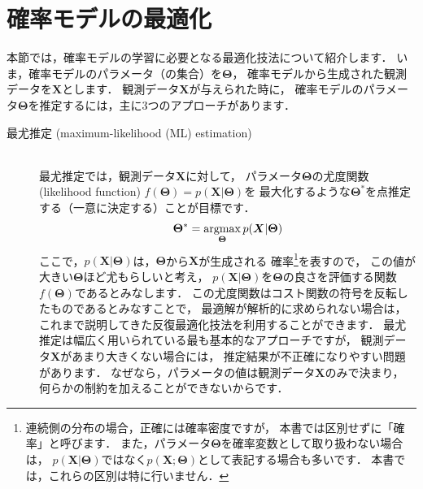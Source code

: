 \section{確率モデルの最適化}
\label{sec:opt_model}

本節では，確率モデルの学習に必要となる最適化技法について紹介します．
いま，確率モデルのパラメータ（の集合）を$\bm\Theta$，
確率モデルから生成された観測データを$\bm{X}$とします．
観測データ$\bm{X}$が与えられた時に，
確率モデルのパラメータ$\bm\Theta$を推定するには，主に3つのアプローチがあります．
\begin{description}
\item[最尤推定 (maximum-likelihood (ML) estimation)] \ \\
最尤推定では，観測データ$\bm{X}$に対して，
パラメータ$\bm\Theta$の尤度関数 (likelihood function)
$f(\bm\Theta) = p(\bm{X}|\bm\Theta)$を
最大化するような$\bm\Theta^*$を点推定する（一意に決定する）ことが目標です．
\begin{align}
\bm\Theta^* = \mathop{\mathrm{argmax}}_{\bm\Theta} p(\bm{X}|\bm\Theta)
\end{align}
ここで，$p(\bm{X}|\bm\Theta)$は，$\bm\Theta$から$\bm{X}$が生成される
確率\footnote{連続側の分布の場合，正確には確率密度ですが，
本書では区別せずに「確率」と呼びます．
また，パラメータ$\bm\Theta$を確率変数として取り扱わない場合は，
$p(\bm{X} | \bm\Theta)$ではなく$p(\bm{X} ; \bm\Theta)$として表記する場合も多いです．
本書では，これらの区別は特に行いません．}を表すので，
この値が大きい$\bm\Theta$ほど尤もらしいと考え，
$p(\bm{X}|\bm\Theta)$を$\bm\Theta$の良さを評価する関数$f(\bm\Theta)$であるとみなします．
この尤度関数はコスト関数の符号を反転したものであるとみなすことで，
最適解が解析的に求められない場合は，
これまで説明してきた反復最適化技法を利用することができます．
最尤推定は幅広く用いられている最も基本的なアプローチですが，
観測データ$\bm{X}$があまり大きくない場合には，
推定結果が不正確になりやすい問題があります．
なぜなら，パラメータの値は観測データ$\bm{X}$のみで決まり，
何らかの制約を加えることができないからです．


\end{description}
